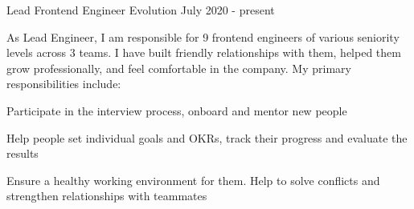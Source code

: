 

\begin{cventries}


  \cventry
    {Lead Frontend Engineer} %
    {Evolution} %
    {} %
    {July 2020 - present} %
    {
      As Lead Engineer, I am responsible for 9 frontend engineers of various seniority levels across 3 teams. I have built friendly relationships with them, helped them grow professionally, and feel comfortable in the company.
      \newline
      My primary responsibilities include:
      \vspace{4mm}
      \begin{cvitems}
        \item Participate in the interview process, onboard and mentor new people
        \item Help people set individual goals and OKRs, track their progress and evaluate the results
        \item Ensure a healthy working environment for them. Help to solve conflicts and strengthen relationships with teammates
      \end{cvitems}
    }


\end{cventries}
